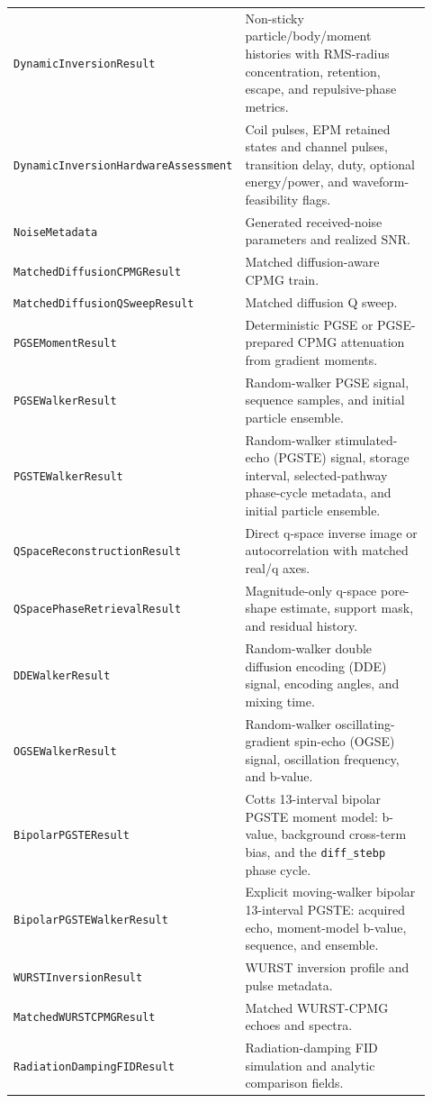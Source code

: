 \documentclass[11pt,oneside]{report}
\newcommand{\code}[1]{\texttt{#1}}
\begin{document}
\begin{longtable}{p{0.43\linewidth}p{0.49\linewidth}}
\code{DynamicInversionResult} & Non-sticky particle/body/moment histories with RMS-radius concentration, retention, escape, and repulsive-phase metrics. \\
\code{DynamicInversionHardwareAssessment} & Coil pulses, EPM retained states and channel pulses, transition delay, duty, optional energy/power, and waveform-feasibility flags. \\
\code{NoiseMetadata} & Generated received-noise parameters and realized SNR. \\
\code{MatchedDiffusionCPMGResult} & Matched diffusion-aware CPMG train. \\
\code{MatchedDiffusionQSweepResult} & Matched diffusion Q sweep. \\
\code{PGSEMomentResult} & Deterministic PGSE or PGSE-prepared CPMG attenuation from gradient moments. \\
\code{PGSEWalkerResult} & Random-walker PGSE signal, sequence samples, and initial particle ensemble. \\
\code{PGSTEWalkerResult} & Random-walker stimulated-echo (PGSTE) signal, storage interval, selected-pathway phase-cycle metadata, and initial particle ensemble. \\
\code{QSpaceReconstructionResult} & Direct q-space inverse image or autocorrelation with matched real/q axes. \\
\code{QSpacePhaseRetrievalResult} & Magnitude-only q-space pore-shape estimate, support mask, and residual history. \\
\code{DDEWalkerResult} & Random-walker double diffusion encoding (DDE) signal, encoding angles, and mixing time. \\
\code{OGSEWalkerResult} & Random-walker oscillating-gradient spin-echo (OGSE) signal, oscillation frequency, and b-value. \\
\code{BipolarPGSTEResult} & Cotts 13-interval bipolar PGSTE moment model: b-value, background cross-term bias, and the \code{diff\_stebp} phase cycle. \\
\code{BipolarPGSTEWalkerResult} & Explicit moving-walker bipolar 13-interval PGSTE: acquired echo, moment-model b-value, sequence, and ensemble. \\
\code{WURSTInversionResult} & WURST inversion profile and pulse metadata. \\
\code{MatchedWURSTCPMGResult} & Matched WURST-CPMG echoes and spectra. \\
\code{RadiationDampingFIDResult} & Radiation-damping FID simulation and analytic comparison fields. \\

\end{longtable}
\end{document}
